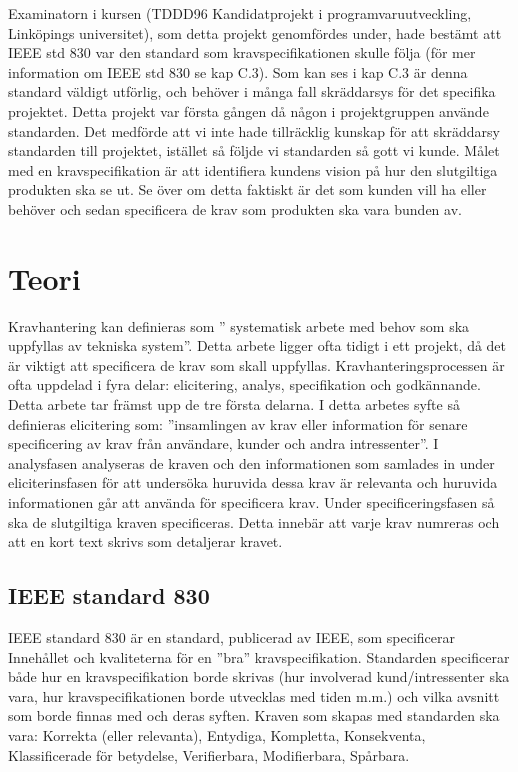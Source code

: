 Examinatorn i kursen (TDDD96 Kandidatprojekt i programvaruutveckling, Linköpings universitet), som detta projekt genomfördes under, hade bestämt att IEEE std 830 var den standard som kravspecifikationen skulle följa (för mer information om IEEE std 830 se kap C.3). Som kan ses i kap C.3 är denna standard väldigt utförlig, och behöver i många fall skräddarsys för det specifika projektet. Detta projekt var första gången då någon i projektgruppen använde standarden. Det medförde att vi inte hade tillräcklig kunskap för att skräddarsy standarden till projektet, istället så följde vi standarden så gott vi kunde. Målet med en kravspecifikation är att identifiera kundens vision på hur den slutgiltiga produkten ska se ut. Se över om detta faktiskt är det som kunden vill ha eller behöver och sedan specificera de krav som produkten ska vara bunden av. 


\section{Teori}
\label{sec:theory-jannering}
Kravhantering kan definieras som ” systematisk arbete med behov som ska uppfyllas av tekniska system”. Detta arbete ligger ofta tidigt i ett projekt, då det är viktigt att specificera de krav som skall uppfyllas. Kravhanteringsprocessen är ofta uppdelad i fyra delar: elicitering, analys, specifikation och godkännande. Detta arbete tar främst upp de tre första delarna. I detta arbetes syfte så definieras elicitering som: ”insamlingen av krav eller information för senare specificering av krav från användare, kunder och andra intressenter”. I analysfasen analyseras de kraven och den informationen som samlades in under eliciterinsfasen för att undersöka huruvida dessa krav är relevanta och huruvida informationen går att använda för specificera krav. Under specificeringsfasen så ska de slutgiltiga kraven specificeras. Detta innebär att varje krav numreras och att en kort text skrivs som detaljerar kravet.
\subsection{IEEE standard 830}
IEEE standard 830 är en standard, publicerad av IEEE, som specificerar Innehållet och kvaliteterna för en ”bra” kravspecifikation. Standarden specificerar både hur en kravspecifikation borde skrivas (hur involverad kund/intressenter ska vara, hur kravspecifikationen borde utvecklas med tiden m.m.) och vilka avsnitt som borde finnas med och deras syften. Kraven som skapas med standarden ska vara: Korrekta (eller relevanta), Entydiga, Kompletta, Konsekventa, Klassificerade för betydelse, Verifierbara, Modifierbara, Spårbara.

